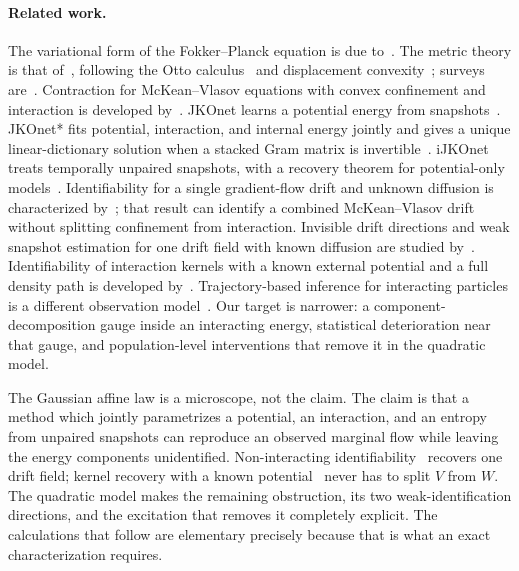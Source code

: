 \documentclass[anon,11pt]{alt2027}
\begin{document}
\paragraph{Related work.}
The variational form of the Fokker--Planck equation is due to~\citet{JKO98}. The
metric theory is that of~\citet{AGS08}, following the Otto calculus~\cite{Otto01} and
displacement convexity~\cite{McCann97}; surveys are~\cite{Villani03,Santambrogio15}.
Contraction for McKean--Vlasov equations with convex confinement and interaction
is developed by~\citet{CarrilloMcCannVillani03,CarrilloMcCannVillani06,Malrieu03}.
JKOnet learns a potential energy from snapshots~\cite{Bunne22}. JKOnet*
fits potential, interaction, and internal energy jointly and gives a unique
linear-dictionary solution when a stacked Gram matrix is
invertible~\cite{Terpin24}. iJKOnet treats temporally unpaired snapshots, with
a recovery theorem for potential-only models~\cite{Persiianov26}. Identifiability
for a single gradient-flow drift and unknown diffusion is characterized
by~\citet{Guan26}; that result can identify a combined McKean--Vlasov drift
without splitting confinement from interaction. Invisible drift directions and
weak snapshot estimation for one drift field with known diffusion are studied
by~\citet{NguyenMalysheva26}. Identifiability of interaction kernels with a
known external potential and a full density path is developed
by~\citet{LangLu22,LangLu23}. Trajectory-based inference for interacting
particles is a different observation model~\cite{Sznitman91}. Our target is
narrower: a component-decomposition gauge inside an interacting energy,
statistical deterioration near that gauge, and population-level interventions
that remove it in the quadratic model.

The Gaussian affine law is a microscope, not the claim. The claim is that a
method which jointly parametrizes a potential, an interaction, and an entropy
from unpaired snapshots can reproduce an observed marginal flow while leaving
the energy components unidentified. Non-interacting identifiability~\cite{Guan26}
recovers one drift field; kernel recovery with a known
potential~\cite{LangLu22,LangLu23} never has to split $V$ from $W$. The
quadratic model makes the remaining obstruction, its two weak-identification
directions, and the excitation that removes it completely explicit. The
calculations that follow are elementary precisely because that is what an
exact characterization requires.
\end{document}
